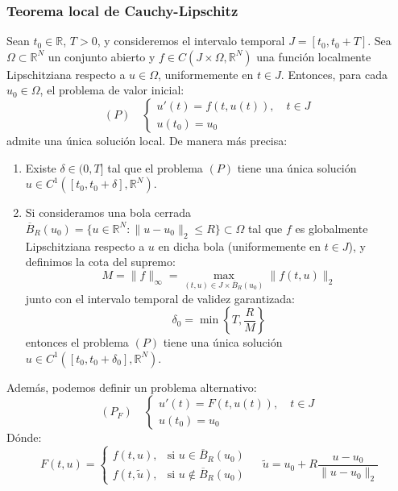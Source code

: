 \subsubsection{ Teorema local de Cauchy-Lipschitz}

\begin{teorema}
    Sean $t_0 \in \mathbb{R}$, $T > 0$, y consideremos el intervalo temporal $J = [t_0, t_0 + T]$. Sea $\Omega \subset \mathbb{R}^N$ un conjunto abierto y $f \in C(J \times \Omega, \mathbb{R}^N)$ una función localmente Lipschitziana respecto a $u \in \Omega$, uniformemente en $t \in J$. Entonces, para cada $u_0 \in \Omega$, el problema de valor inicial:
    \[
        (P) \quad
        \begin{cases}
            u'(t) = f(t, u(t)), \quad t \in J \\
            u(t_0) = u_0
        \end{cases}
    \]
    admite una única solución local. De manera más precisa:
    \begin{enumerate}
        \item Existe $\delta \in (0, T]$ tal que el problema $(P)$ tiene una única solución $u \in C^1([t_0, t_0 + \delta], \mathbb{R}^N)$.
        \item Si consideramos una bola cerrada $\overline{B}_R(u_0) = \{u \in \mathbb{R}^N : \| u - u_0 \|_2 \leq R\} \subset \Omega$ tal que $f$ es globalmente Lipschitziana respecto a $u$ en dicha bola (uniformemente en $t \in J$), y definimos la cota del supremo:
        \[
            M = \| f \|_\infty = \max_{(t,u) \in J \times \overline{B}_R(u_0)} \| f(t,u) \|_2
        \]
        junto con el intervalo temporal de validez garantizada:
        \[
            \delta_0 = \min \left\{ T, \frac{R}{M} \right\}
        \]
        entonces el problema $(P)$ tiene una única solución $u \in C^1([t_0, t_0 + \delta_0], \mathbb{R}^N)$.
    \end{enumerate}
    Además, podemos definir un problema alternativo:
    \[
        (P_F) \quad
        \begin{cases}
            u'(t) = F(t, u(t)), \quad t \in J \\
            u(t_0) = u_0
        \end{cases}
    \]
    Dónde:
    \[
        F(t,u) = \begin{cases}
            f(t,u), & \text{si } u \in \overline{B}_R(u_0) \\
            f(t, \tilde{u}), & \text{si } u \notin \overline{B}_R(u_0)
        \end{cases}
        \, \quad
        \tilde{u} = u_0 + R \frac{u - u_0}{\| u - u_0 \|_2}
    \]
    \begin{center}
\end{center}
\end{teorema}
